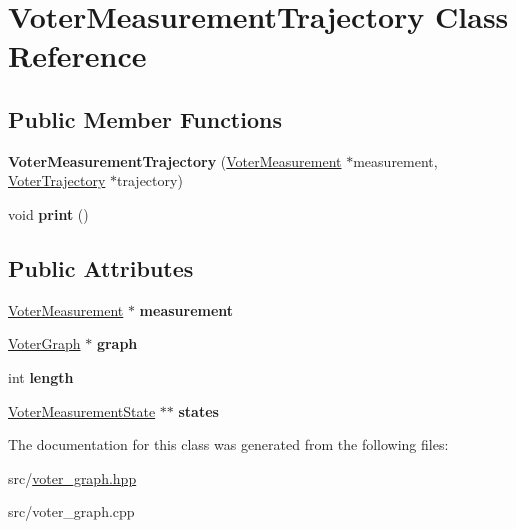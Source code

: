\hypertarget{classVoterMeasurementTrajectory}{\section{Voter\-Measurement\-Trajectory Class Reference}
\label{classVoterMeasurementTrajectory}
}
\subsection*{Public Member Functions}
\begin{DoxyCompactItemize}
\item 
\hypertarget{classVoterMeasurementTrajectory_aaad656cfffcd452d36642e48d3593fc5}{{\bfseries Voter\-Measurement\-Trajectory} (\hyperlink{classVoterMeasurement}{Voter\-Measurement} $\ast$measurement, \hyperlink{classVoterTrajectory}{Voter\-Trajectory} $\ast$trajectory)}\label{classVoterMeasurementTrajectory_aaad656cfffcd452d36642e48d3593fc5}

\item 
\hypertarget{classVoterMeasurementTrajectory_afc46bed33c05a96e7a4ea735ba7ac144}{void {\bfseries print} ()}\label{classVoterMeasurementTrajectory_afc46bed33c05a96e7a4ea735ba7ac144}

\end{DoxyCompactItemize}
\subsection*{Public Attributes}
\begin{DoxyCompactItemize}
\item 
\hypertarget{classVoterMeasurementTrajectory_ada8cb1fb7a9559a8ae6501b9b3d8f0db}{\hyperlink{classVoterMeasurement}{Voter\-Measurement} $\ast$ {\bfseries measurement}}\label{classVoterMeasurementTrajectory_ada8cb1fb7a9559a8ae6501b9b3d8f0db}

\item 
\hypertarget{classVoterMeasurementTrajectory_a0bafd05cf7d38e76469dbcca21ac5c92}{\hyperlink{classVoterGraph}{Voter\-Graph} $\ast$ {\bfseries graph}}\label{classVoterMeasurementTrajectory_a0bafd05cf7d38e76469dbcca21ac5c92}

\item 
\hypertarget{classVoterMeasurementTrajectory_a5447124d24ed50c0ef86ec72f3e0e973}{int {\bfseries length}}\label{classVoterMeasurementTrajectory_a5447124d24ed50c0ef86ec72f3e0e973}

\item 
\hypertarget{classVoterMeasurementTrajectory_aaca3b94c576c8d83b8cdac6455a503bb}{\hyperlink{classVoterMeasurementState}{Voter\-Measurement\-State} $\ast$$\ast$ {\bfseries states}}\label{classVoterMeasurementTrajectory_aaca3b94c576c8d83b8cdac6455a503bb}

\end{DoxyCompactItemize}


The documentation for this class was generated from the following files\-:\begin{DoxyCompactItemize}
\item 
src/\hyperlink{voter__graph_8hpp}{voter\-\_\-graph.\-hpp}\item 
src/voter\-\_\-graph.\-cpp\end{DoxyCompactItemize}
